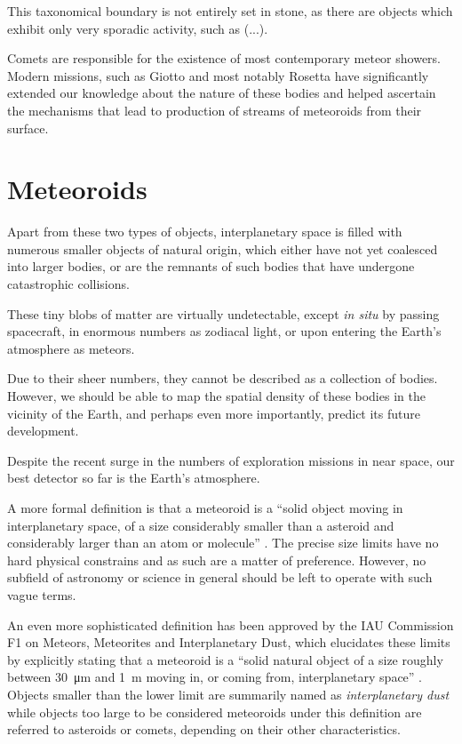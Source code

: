     This taxonomical boundary is not entirely set in stone, as there are objects which exhibit
    only very sporadic activity, such as (...).

    Comets are responsible for the existence of most contemporary meteor showers.
    Modern missions, such as Giotto and most notably Rosetta have significantly extended our knowledge
    about the nature of these bodies and helped ascertain the mechanisms that lead to production
    of streams of meteoroids from their surface.

\section{Meteoroids} \label{am}
    Apart from these two types of objects, interplanetary space is filled with numerous smaller objects
    of natural origin, which either have not yet coalesced into larger bodies, or are the remnants
    of such bodies that have undergone catastrophic collisions.

    These tiny blobs of matter are virtually undetectable, except \textit{in situ} by passing spacecraft,
    in enormous numbers as zodiacal light, or upon entering the Earth's atmosphere as meteors.

    Due to their sheer numbers, they cannot be described as a collection of bodies.
    However, we should be able to map the spatial density of these bodies in the vicinity of the Earth,
    and perhaps even more importantly, predict its future development.

    Despite the recent surge in the numbers of exploration missions in near space,
    our best detector so far is the Earth's atmosphere.



    A more formal definition is that a meteoroid is a ``solid object moving in interplanetary space,
    of a size considerably smaller than a asteroid and considerably larger than an atom or molecule'' \cite{imo-glossary}.
    The precise size limits have no hard physical constrains and as such are a matter of preference.
    However, no subfield of astronomy or science in general should be left to operate with such vague terms.

    An even more sophisticated definition has been approved by the IAU Commission F1 on Meteors, Meteorites and Interplanetary Dust,
    which elucidates these limits by explicitly stating that a meteoroid is a ``solid natural object
    of a size roughly between \SI{30}{\micro\metre} and \SI{1}{\metre} moving in, or coming from, interplanetary space'' \cite{imo-definitions}.
    Objects smaller than the lower limit are summarily named as \emph{interplanetary dust} while objects
    too large to be considered meteoroids under this definition are referred to
    asteroids or comets, depending on their other characteristics.

